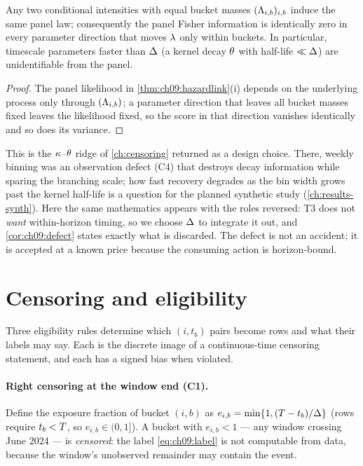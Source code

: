 \begin{corollary}\label{cor:ch09:defect}
Any two conditional intensities with equal bucket masses
$(\Lambda_{i,b})_{i,b}$ induce the same panel law; consequently the panel
Fisher information is identically zero in every parameter direction that
moves $\lambda$ only within buckets. In particular, timescale parameters
faster than $\Delta$ (a kernel decay $\theta$ with half-life
$\ll \Delta$) are unidentifiable from the panel.
\end{corollary}

\begin{proof}
The panel likelihood in \cref{thm:ch09:hazardlink}(i) depends on the
underlying process only through $(\Lambda_{i,b})$; a parameter direction
that leaves all bucket masses fixed leaves the likelihood fixed, so the
score in that direction vanishes identically and so does its variance.
\end{proof}

This is the $\kappa$--$\theta$ ridge of \cref{ch:censoring} returned as
a design choice. There, weekly binning was an observation defect (C4)
that destroys decay information while sparing the branching scale; how
fast recovery degrades as the bin width grows past the kernel half-life
is a question for the planned synthetic study (\cref{ch:results-synth}).
Here the same mathematics appears with the roles reversed: T3 does not
\emph{want} within-horizon timing, so we choose $\Delta$ to integrate
it out, and \cref{cor:ch09:defect} states exactly what is discarded.
The defect is not an accident; it is accepted at a known price because
the consuming action is horizon-bound.

\section{Censoring and eligibility}\label{ch09:sec:censoring}

Three eligibility rules determine which $(i, t_b)$ pairs become rows and
what their labels may say. Each is the discrete image of a
continuous-time censoring statement, and each has a signed bias when
violated.

\paragraph{Right censoring at the window end (C1).} Define the exposure
fraction of bucket $(i,b)$ as
$e_{i,b} = \min\{1, (T - t_b)/\Delta\}$ (rows require
$t_b < T$, so $e_{i,b} \in (0,1]$). A bucket with $e_{i,b} < 1$ ---
any window crossing June 2024 --- is \emph{censored}: the label
\cref{eq:ch09:label} is not computable from data, because the window's
unobserved remainder may contain the event.

